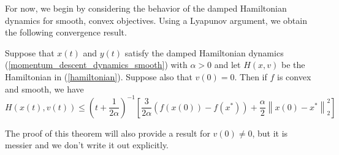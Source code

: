 For now, we begin by considering the behavior of the damped Hamiltonian dynamics for smooth, convex
objectives. Using a Lyapunov argument, we obtain the following convergence result.
\begin{theorem}\label{continuous_hamiltonian_convergence_smooth}
 Suppose that $x(t)$ and $y(t)$ satisfy the damped Hamiltonian dynamics (\ref{momentum_descent_dynamics_smooth}) with $\alpha > 0$ and
 let $H(x,v)$ be the Hamiltonian in (\ref{hamiltonian}). Suppose also that $v(0) = 0$. Then if $f$ is convex and smooth, we have
 \begin{equation}\label{hamiltonian_decay_bound_smooth}
  H(x(t),v(t)) \leq \left(t + \frac{1}{2\alpha}\right)^{-1}\left[\frac{3}{2\alpha}(f(x(0)) - f(x^*)) + \frac{\alpha}{2}\left\|x(0) - x^*\right\|_2^2\right]
 \end{equation}

\end{theorem}
The proof of this theorem will also provide a result for $v(0) \neq 0$, but it is messier and we don't write it out explicitly.
